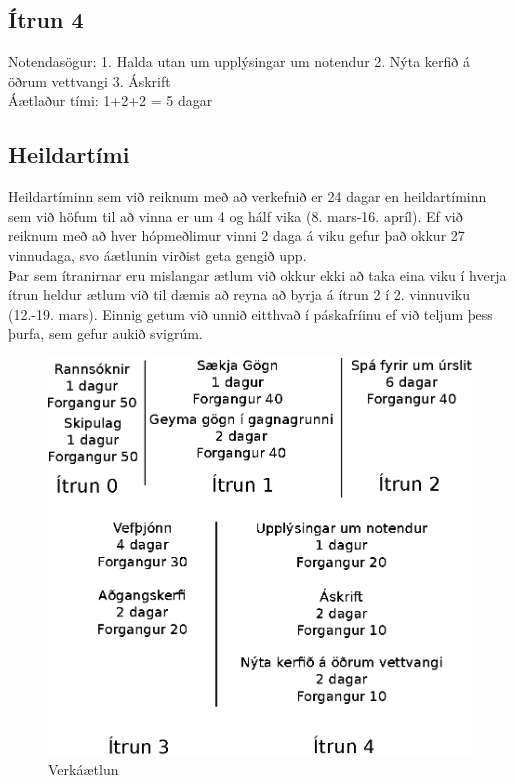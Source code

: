 \documentclass[a4paper,11pt]{article}
\begin{document}
\subsection{Ítrun 4}
Notendasögur: 1. Halda utan um upplýsingar um notendur 2. Nýta kerfið á öðrum vettvangi 3. Áskrift\\
Áætlaður tími: 1+2+2 = 5 dagar

\subsection{Heildartími}
Heildartíminn sem við reiknum með að verkefnið er 24 dagar en heildartíminn sem við höfum til að vinna er um 4 og hálf vika (8. mars-16. apríl). Ef við reiknum með að hver hópmeðlimur vinni 2 daga á viku gefur það okkur 27 vinnudaga, svo áætlunin virðist geta gengið upp.\\

Þar sem ítranirnar eru mislangar ætlum við okkur ekki að taka eina viku í hverja ítrun heldur ætlum við til dæmis að reyna að byrja á ítrun 2 í 2. vinnuviku (12.-19. mars). Einnig getum við unnið eitthvað í páskafríinu ef við teljum þess þurfa, sem gefur aukið svigrúm. \\

\begin{figure}[H]
  \centering
  \includegraphics{verkaetlunarmynd}
  \caption{Verkáætlun}
  \label{fig:verkaetlun}
\end{figure}
\end{document}
